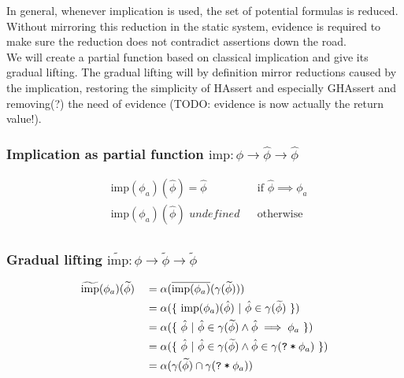 \documentclass[11pt,a4paper]{article}
\newcommand{\ttt}{\texttt}
\newcommand{\grad}[1]{\widetilde{#1}}
\newcommand{\qm}{\ttt{?}}
\newcommand{\withqm}[1]{\ttt{\qm\:*\:$#1$}}
\newcommand{\imp}{\textrm{imp}}
\begin{document}
In general, whenever implication is used, the set of potential formulas is reduced. Without mirroring this reduction in the static system, evidence is required to make sure the reduction does not contradict assertions down the road.\\

We will create a partial function based on classical implication and give its gradual lifting.
The gradual lifting will by definition mirror reductions caused by the implication, restoring the simplicity of HAssert and especially GHAssert and removing(?) the need of evidence (TODO: evidence is now actually the return value!).\\


\subsubsection{Implication as partial function $\imp : \phi \rightarrow \hat{\phi} \rightarrow \hat{\phi}$}
\begin{align*}
&\imp(\phi_a)(\hat{\phi}) = \hat{\phi}                   &&\text{if $\hat{\phi} \implies \phi_a$}\\
&\imp(\phi_a)(\hat{\phi}) \textit{~undefined}      &&\text{otherwise}\\
\end{align*}

\subsubsection{Gradual lifting $\grad{\imp} : \phi \rightarrow \grad{\phi} \rightarrow \grad{\phi}$}
\begin{align*}
&\grad{\imp}(\phi_a)(\grad{\phi}) 
  &&= \alpha(\overline{\imp(\phi_a)}(\gamma(\grad{\phi})))\\
& &&= \alpha(\{~ \imp(\phi_a)(\hat{\phi}) ~|~ \hat{\phi} \in \gamma(\grad{\phi}) ~\})\\
& &&= \alpha(\{~ \hat{\phi} ~|~ \hat{\phi} \in \gamma(\grad{\phi}) \wedge \hat{\phi} \implies \phi_a ~\})\\
& &&= \alpha(\{~ \hat{\phi} ~|~ \hat{\phi} \in \gamma(\grad{\phi}) \wedge \hat{\phi} \in \gamma(\withqm{\phi_a}) ~\})\\
& &&= \alpha(\gamma(\grad{\phi}) \cap \gamma(\withqm{\phi_a}))\\
\end{align*}
\end{document}
